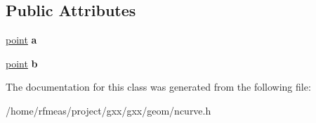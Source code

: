 \subsection*{Public Attributes}
\begin{DoxyCompactItemize}
\item 
\hyperlink{classgxx_1_1ngeom_1_1point}{point} {\bfseries a}\hypertarget{classgxx_1_1ngeom_1_1line_ae9dc89e70b6786382e56e69e44c61214}{}\label{classgxx_1_1ngeom_1_1line_ae9dc89e70b6786382e56e69e44c61214}

\item 
\hyperlink{classgxx_1_1ngeom_1_1point}{point} {\bfseries b}\hypertarget{classgxx_1_1ngeom_1_1line_a93c7c65139b82c88db0993767eb65f6f}{}\label{classgxx_1_1ngeom_1_1line_a93c7c65139b82c88db0993767eb65f6f}

\end{DoxyCompactItemize}


The documentation for this class was generated from the following file\+:\begin{DoxyCompactItemize}
\item 
/home/rfmeas/project/gxx/gxx/geom/ncurve.\+h\end{DoxyCompactItemize}

